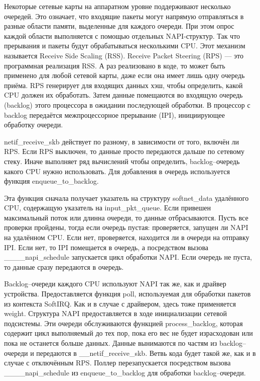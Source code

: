 Некоторые сетевые карты на аппаратном уровне поддерживают несколько очередей. Это означает, что входящие пакеты могут напрямую отправляться в разные области памяти, выделенные для каждого очереди. При этом опрос каждой области выполняется с помощью отдельных NAPI-структур. Так что прерывания и пакеты будут обрабатываться несколькими CPU. Этот механизм называется Receive Side Scaling (RSS). Receive Packet Steering (RPS) --- это программная реализация RSS. А раз реализовано в коде, то может быть применено для любой сетевой карты, даже если она имеет лишь одну очередь приёма. RPS генерирует для входящих данных хэш, чтобы определить, какой CPU должен их обработать. Затем данные помещаются во входящую очередь (backlog) этого процессора в ожидании последующей обработки. В процессор с backlog передаётся межпроцессорное прерывание (IPI), инициирующее обработку очереди.

netif\_receive\_skb действует по разному, в зависимости от того, включён ли RPS. Если RPS выключен, то данные просто передаются дальше по сетевому стеку. Иначе выполняет ряд вычислений чтобы определить, backlog--очередь какого CPU нужно использовать. Для добавления в очередь используется функция enqueue\_to\_backlog.

Эта функция сначала получает указатель на структуру softnet\_data удалённого CPU, содержащую указатель на input\_pkt\_queue. Если привешен максимальный поток или длинна очереди, то данные отбрасываются. Пусть все проверки пройдены, тогда если очередь пустая: проверяется, запущен ли NAPI на удалённом CPU. Если нет, проверяется, находится ли в очереди на отправку IPI. Если нет, то IPI помещается в очередь, а посредством вызова \_\_\_\_napi\_schedule запускается цикл обработки NAPI. Если очередь не пуста, то данные сразу передаются в очередь.

Backlog--очереди каждого CPU используют NAPI так же, как и драйвер устройства. Предоставляется функция poll, используемая для обработки пакетов из контекста SoftIRQ. Как и в случае с драйвером, здесь тоже применяется weight. Структура NAPI предоставляется в ходе инициализации сетевой подсистемы. Эти очереди обслуживаются функцией process\_backlog, которая содержит цикл выполняемый до тех пор, пока его вес не будет израсходован или пока не останется больше данных. Данные вынимаются по частям из backlog--очереди и передаются в \_\_netif\_receive\_skb. Ветвь кода будет такой же, как и в случае с отключённым RPS. Поллер перезапускается посредством вызова \_\_\_\_napi\_schedule из enqueue\_to\_backlog для обработки backlog--очереди.

